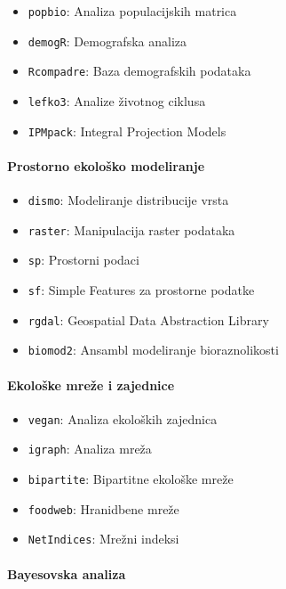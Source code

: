 \documentclass[11pt,oneside]{book}
\begin{document}
\begin{itemize}
	\item \texttt{popbio}: Analiza populacijskih matrica
	\item \texttt{demogR}: Demografska analiza
	\item \texttt{Rcompadre}: Baza demografskih podataka
	\item \texttt{lefko3}: Analize životnog ciklusa
	\item \texttt{IPMpack}: Integral Projection Models
\end{itemize}

\paragraph{Prostorno ekološko modeliranje}

\begin{itemize}
	\item \texttt{dismo}: Modeliranje distribucije vrsta
	\item \texttt{raster}: Manipulacija raster podataka
	\item \texttt{sp}: Prostorni podaci
	\item \texttt{sf}: Simple Features za prostorne podatke
	\item \texttt{rgdal}: Geospatial Data Abstraction Library
	\item \texttt{biomod2}: Ansambl modeliranje bioraznolikosti
\end{itemize}

\paragraph{Ekološke mreže i zajednice}

\begin{itemize}
	\item \texttt{vegan}: Analiza ekoloških zajednica
	\item \texttt{igraph}: Analiza mreža
	\item \texttt{bipartite}: Bipartitne ekološke mreže
	\item \texttt{foodweb}: Hranidbene mreže
	\item \texttt{NetIndices}: Mrežni indeksi
\end{itemize}

\paragraph{Bayesovska analiza}
\end{document}
